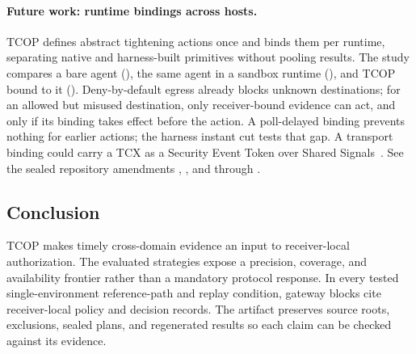 \paragraph{Future work: runtime bindings across hosts.}
TCOP defines abstract tightening actions once and binds them per runtime, separating native and harness-built primitives without pooling results. The study compares a bare agent (\FutureBareArm{}), the same agent in a sandbox runtime (\FutureSandboxArm{}), and TCOP bound to it (\FutureTCOPArm{}). Deny-by-default egress already blocks unknown destinations; for an allowed but misused destination, only receiver-bound evidence can act, and only if its binding takes effect before the action. A poll-delayed binding prevents nothing for earlier actions; the harness instant cut tests that gap. A transport binding could carry a TCX as a Security Event Token over Shared Signals~\cite{rfc8417,openid-ssf-1.0}. See the sealed repository amendments \ifdefined\TCOPPreprint{}, , and \else{} through \fi.

\subsection{Conclusion}

TCOP makes timely cross-domain evidence an input to receiver-local authorization. The evaluated strategies expose a precision, coverage, and availability frontier rather than a mandatory protocol response. In every tested single-environment reference-path and replay condition, gateway blocks cite receiver-local policy and decision records. The artifact preserves source roots, exclusions, sealed plans, and regenerated results so each claim can be checked against its evidence.
